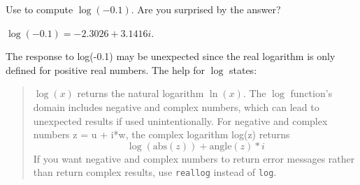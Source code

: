 \documentclass{ximera}
\begin{document}
\begin{computerExercise}\label{YZ_1.2_operation3}
Use \Matlab to compute $\log(-0.1) $.  Are you surprised by the answer? 

\begin{solution}
\ans $\log(-0.1) = -2.3026 + 3.1416 i$.

\soln
The \Matlab response to log(-0.1) may be unexpected since the real logarithm is only defined for positive real numbers.  The \Matlab help for $\log$ states:

\begin{quote}
$\log(x)$ returns the natural logarithm $\ln(x)$.
The $\log$ function’s domain includes negative and complex numbers, which can lead to unexpected results if used unintentionally. For negative and complex numbers z = u + i*w, the complex logarithm log(z) returns
\[
\log(\text{abs}(z)) + \text{angle}(z)*i
\]
If you want negative and complex numbers to return error messages rather than return complex results, use {\tt reallog} instead of {\tt log}.
\end{quote}
\end{solution}
\end{computerExercise}
\end{document}
